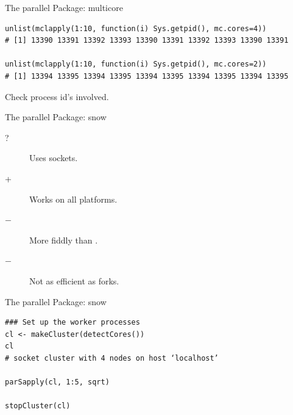 \begin{frame}[fragile]
  \begin{block}{The parallel Package: multicore}
\begin{lstlisting}
unlist(mclapply(1:10, function(i) Sys.getpid(), mc.cores=4))
# [1] 13390 13391 13392 13393 13390 13391 13392 13393 13390 13391

unlist(mclapply(1:10, function(i) Sys.getpid(), mc.cores=2))
# [1] 13394 13395 13394 13395 13394 13395 13394 13395 13394 13395
\end{lstlisting}
  \end{block}
Check process id's involved.
\end{frame}


\begin{frame}
  \begin{block}{The parallel Package: snow}
    \begin{description}
      \item[?] Uses sockets.
      \item[+] Works on all platforms.
      \item[$-$] More fiddly than .
      \item[$-$] Not as efficient as forks.
    \end{description}
  \end{block}
\end{frame}


\begin{frame}[fragile]
  \begin{block}{The parallel Package: snow}
\begin{lstlisting}
### Set up the worker processes
cl <- makeCluster(detectCores())
cl
# socket cluster with 4 nodes on host ‘localhost’

parSapply(cl, 1:5, sqrt)

stopCluster(cl)
\end{lstlisting}
  \end{block}
\end{frame}



